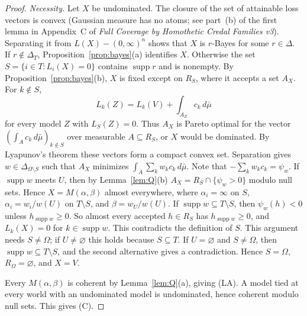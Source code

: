 \documentclass[11pt]{article}
\theoremstyle{remark}\newtheorem{remark}[theorem]{Remark}
\newcommand{\supp}{\operatorname{supp}}
\begin{document}
\begin{proof}
\emph{Necessity.} Let $X$ be undominated. The closure of the set of
attainable loss vectors is convex (Gaussian measure has no atoms; see
part~(b) of the first lemma in Appendix~C of \emph{Full Coverage by
Homothetic Credal Families v3}). Separating it from $L(X)-(0,\infty)^n$ shows that $X$ is
$r$-Bayes for some $r\in\Delta$. If $r\notin\Delta_T$,
Proposition~\ref{prop:bayes}(a) identifies $X$. Otherwise the set
$S=\{i\in T:L_i(X)=0\}$ contains $\supp r$ and is nonempty. By
Proposition~\ref{prop:bayes}(b), $X$ is fixed except on $R_S$, where it
accepts a set $A_X$. For $k\notin S$,
\[
 L_k(Z)=L_k(V)+\int_{A_Z}c_k\,d\bar\mu
\]
for every model $Z$ with $L_S(Z)=0$. Thus $A_X$ is Pareto optimal for the
vector $(\int_Ac_k\,d\bar\mu)_{k\notin S}$ over measurable $A\subseteq R_S$,
or $X$ would be dominated. By Lyapunov's theorem these vectors form a
compact convex set. Separation gives $w\in\Delta_{\Omega\setminus S}$ such
that $A_X$ minimizes $\int_A\sum_kw_kc_k\,d\bar\mu$. Note that
$-\sum_kw_kc_k=\psi_w$. If $\supp w$ meets $U$, then by
Lemma~\ref{lem:Q}(b) $A_X=R_S\cap\{\psi_w>0\}$ modulo null sets. Hence
$X=M(\alpha,\beta)$ almost everywhere, where $\alpha_i=\infty$ on $S$,
$\alpha_i=w_i/w(U)$ on $T\setminus S$, and $\beta=w_U/w(U)$. If
$\supp w\subseteq T\setminus S$, then $\psi_w(h)<0$ unless
$h_{\supp w}\ge0$. So almost every accepted $h\in R_S$ has
$h_{\supp w}\ge0$, and $L_k(X)=0$ for $k\in\supp w$. This contradicts the
definition of $S$. This argument needs $S\ne\Omega$; if $U\ne\varnothing$
this holds because $S\subseteq T$. If $U=\varnothing$ and $S\ne\Omega$, then
$\supp w\subseteq T\setminus S$, and the second alternative gives a
contradiction. Hence $S=\Omega$, $R_\Omega=\varnothing$, and $X=V$.

Every $M(\alpha,\beta)$ is coherent by Lemma~\ref{lem:Q}(a), giving (LA).
A model tied at every world with an undominated model is undominated,
hence coherent modulo null sets. This gives (C).
\end{proof}
\end{document}

